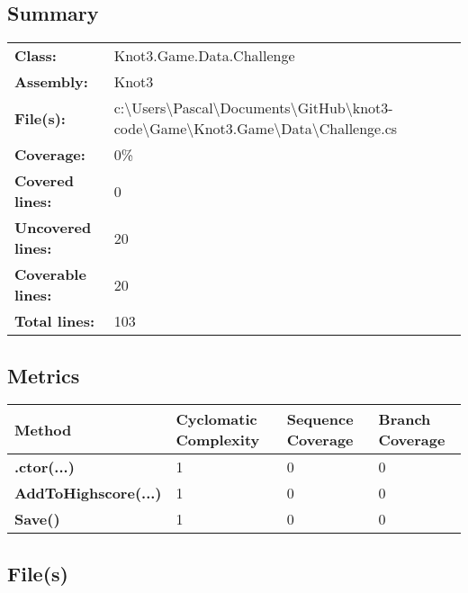 \documentclass[a4paper,10pt]{article}
\begin{document}
\subsection{Summary}
\begin{longtable}[l]{ll}
\textbf{Class:} & Knot3.Game.Data.Challenge\\
\textbf{Assembly:} & Knot3\\
\textbf{File(s):} & \begin{minipage}[t]{12cm}{c:\textbackslash Users\textbackslash Pascal\textbackslash Documents\textbackslash GitHub\textbackslash knot3-code\textbackslash Game\textbackslash Knot3.Game\textbackslash Data\textbackslash Challenge.cs}\end{minipage} \\
\textbf{Coverage:} & 0\%\\
\textbf{Covered lines:} & 0\\
\textbf{Uncovered lines:} & 20\\
\textbf{Coverable lines:} & 20\\
\textbf{Total lines:} & 103\\
\end{longtable}
\subsection{Metrics}
\begin{longtable}[l]{|l|l|l|l|}
\hline
\textbf{Method} & \textbf{Cyclomatic Complexity} & \textbf{Sequence Coverage} & \textbf{Branch Coverage}\\
\hline
\textbf{.ctor(...)} & 1 & 0 & 0\\
\hline
\textbf{AddToHighscore(...)} & 1 & 0 & 0\\
\hline
\textbf{Save()} & 1 & 0 & 0\\
\hline
\end{longtable}
\subsection{File(s)}
\end{document}
